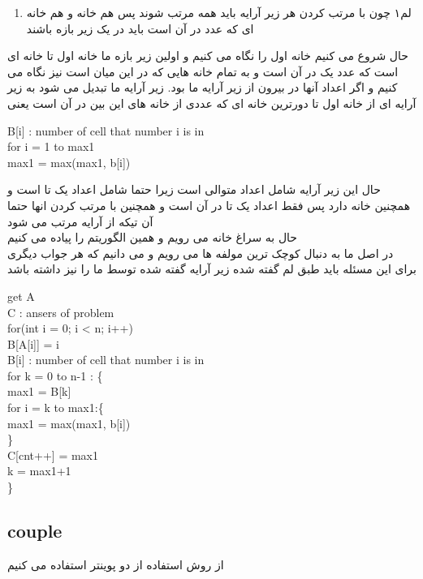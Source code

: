 \documentclass[a4paper]{article}
\begin{document}
\begin{enumerate}
\item{لم۱}
چون با مرتب کردن هر زیر آرایه باید همه مرتب شوند پس هم خانه 
و هم خانه ای که عدد
در آن است باید در یک زیر بازه باشند
\end{enumerate}
حال شروع می کنیم خانه اول را نگاه می کنیم و اولین زیر بازه ما خانه اول تا خانه ای است که عدد یک در آن است و به تمام خانه هایی که در این میان است نیز نگاه می کنیم و اگر اعداد آنها در بیرون از زیر آرایه ما بود. زیر آرایه ما تبدیل می شود به زیر آرایه ای از خانه اول تا دورترین خانه ای که عددی از خانه های این بین در آن است
یعنی
\begin{latin}
B[i] : number of cell that number i is in\\

for i = 1 to max1\\

max1 = max(max1, b[i])\\

\end{latin}
حال این زیر آرایه شامل اعداد متوالی است زیرا حتما شامل اعداد یک تا
است و همچنین 
خانه دارد پس فقط اعداد یک تا 
در آن است
و همچنین با مرتب کردن انها حتما آن تیکه از آرایه مرتب می شود\\

حال به سراغ خانه 
می رویم و همین الگوریتم را پیاده می کنیم
\\
در اصل ما به دنبال کوچک ترین مولفه ها می رویم و می دانیم که هر جواب دیگری برای این مسئله باید طبق لم گفته شده\lr{,} زیر آرایه گفته شده توسط ما را نیز داشته باشد\\

\begin{latin}
get A\\
C : ansers of problem\\
for(int i = 0; i < n; i++)\\
B[A[i]] = i\\
B[i] : number of cell that number i is in\\
for k = 0 to n-1 : \{\\
	max1 = B[k]\\
	for i = k to max1:\{\\
		max1 = max(max1, b[i])\\
		\}\\
	C[cnt++] = max1\\
	k = max1+1\\
	\}\\
\end{latin}
\newpage
\begin{latin}
\section*{couple}	
\end{latin}
از روش استفاده از دو پوینتر استفاده می کنیم
\end{document}
